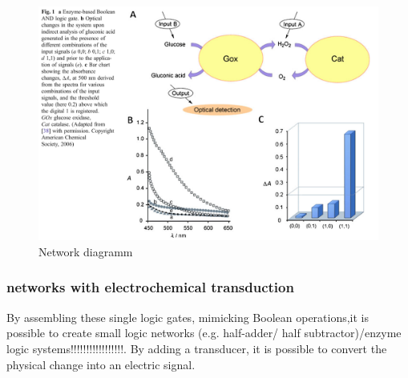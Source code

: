 \documentclass[runningheads]{llncs}
\begin{document}
		\begin{figure}[H] \centering \includegraphics[scale= 0.3]{pics/AND.png} \caption{Network diagramm} \label{img:and} \end{figure}
	
	
	\subsubsection{networks with electrochemical transduction}
		By assembling these single logic gates, mimicking Boolean operations,it is possible to create small logic networks (e.g. half-adder/ half subtractor)/enzyme logic systems!!!!!!!!!!!!!!!!!. By adding a transducer, it is possible to convert the physical change into an electric signal.
	
\end{document}
